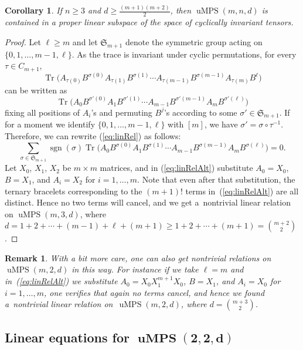 \documentclass[pdftex]{sigma}
\numberwithin{equation}{section}
\newtheorem{Corollary}[Theorem]{Corollary}
\newtheorem{Remark}[Theorem]{Remark}
\DeclareMathOperator{\Tr}{Tr}
\DeclareMathOperator{\sgn}{sgn}
\newcommand{\SG}{\mathfrak{S}}
\DeclareMathOperator{\uMPS}{uMPS}
\begin{document}
\begin{Corollary}\label{cor: lin span}
	If $n \geq 3$ and $d \geq \frac{(m+1)(m+2)}{2}$, then ${\uMPS(m,n,d)}$ is contained in a proper linear subspace of the space of cyclically invariant tensors.
\end{Corollary}
\begin{proof}
Let $\ell \geq m$ and let $\SG_{m+1}$ denote the symmetric group acting on $\{0,1,\dots,m-1,\ell\}$. As the trace is invariant under cyclic permutations, for every $\tau \in C_{m+1}$, \[\Tr\big(A_{\tau(0)}B^{\sigma(0)}A_{\tau(1)}B^{\sigma(1)} \cdots A_{\tau(m-1)}B^{\sigma(m-1)}A_{\tau(m)}B^{\ell}\big)\] can be written as \[\Tr\big(A_{0}B^{\sigma'(0)}A_{1}B^{\sigma'(1)} \cdots A_{m-1}B^{\sigma'(m-1)}A_{m}B^{\sigma'(\ell)}\big)\] fixing all positions of $A_i$'s and permuting $B^j$'s according to some $\sigma' \in \mathfrak{S}_{m+1}$. If for a moment we identify $\{0,1,\dots,m-1,\ell\}$ with $[m]$, we have $\sigma'=\sigma \circ \tau^{-1}$. Therefore, we can rewrite (\ref{eq:linRel}) as follows:
\begin{equation} \label{eq:linRelAlt}
	\sum_{\sigma \in \mathfrak{S}_{m+1}}{\sgn(\sigma)\Tr\big(A_{0}B^{\sigma(0)}A_{1}B^{\sigma(1)} \cdots A_{m-1}B^{\sigma(m-1)}A_{m}B^{\sigma(\ell)}\big)}=0.
\end{equation}
Let $X_0$, $X_1$, $X_2$ be $m \times m$ matrices, and in (\ref{eq:linRelAlt}) substitute $A_0=X_0$, $B=X_1$, and $A_i = X_2$ for $i=1,\dots,m$. Note that even after that substitution, the ternary bracelets corresponding to the $(m+1)!$ terms in~(\ref{eq:linRelAlt}) are all distinct. Hence no two terms will cancel, and we get a~nontrivial linear relation on $\uMPS(m,3,d)$, where $d=1+2+\cdots+(m-1)+ \ell + (m+1) \geq 1+2+\cdots+ (m+1) = \binom{m+2}{2}$.
\end{proof}

\begin{Remark}
With a bit more care, one can also get nontrivial relations on $\uMPS(m,2,d)$ in this way. For instance if we take $\ell=m$ and in~(\ref{eq:linRelAlt}) we substitute $A_0=X_0X_1^{m+1}X_0$, $B=X_1$, and $A_i = X_0$ for $i=1,\dots,m$, one verifies that again no terms cancel, and hence we found a~nontrivial linear relation on~$\uMPS(m,2,d)$, where $d=\binom{m+3}{2}$.
\end{Remark}

\subsection[Linear equations for uMPS(2,2,d)]{Linear equations for $\boldsymbol{\uMPS(2,2,d)}$} \label{sec:lineq22d}
\end{document}
